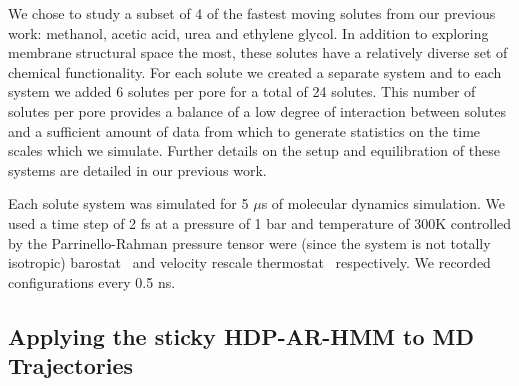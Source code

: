\documentclass[journal=jpcbfk,manuscript=article]{achemso}
\begin{document}
  We chose to study a subset of 4 of the fastest moving solutes from our previous
  work: methanol, acetic acid, urea and ethylene glycol.
  In addition to exploring membrane structural space the most, these solutes have a
  relatively diverse set of chemical functionality. For each solute we created a 
  separate system and to each system we added 6 solutes per pore for a total of 24 solutes. This number 
  of solutes per pore provides a balance of a low degree of interaction between 
  solutes and a sufficient amount of data from which to generate statistics on the
  time scales which we simulate. Further details on the setup and equilibration of
  these systems are detailed in our previous work.\cite{coscia_chemically_2019}
  
  Each solute system was simulated for 5 $\mu$s of molecular dynamics  simulation. We used a time step of 2 fs
  at a pressure of 1 bar and temperature of 300K controlled by the Parrinello-Rahman 
  pressure tensor were (since the system is not totally isotropic)
  barostat~\cite{parrinello_polymorphic_1981} and velocity rescale 
  thermostat~\cite{bussi_canonical_2007} respectively. We recorded configurations every 0.5 ns.

  \subsection{Applying the sticky HDP-AR-HMM to MD Trajectories}\label{method:HDP-AR-HMM}

  
  
  
\end{document}
